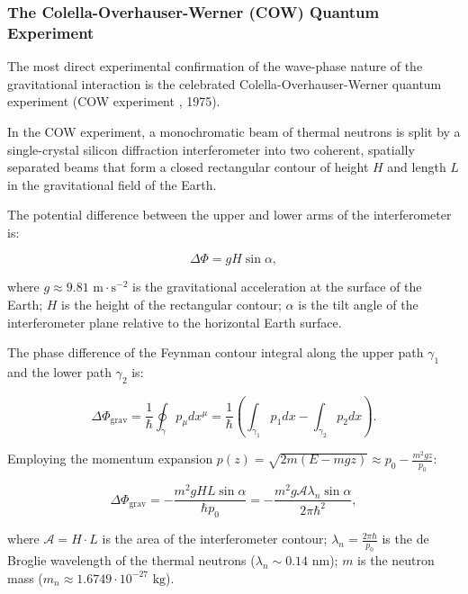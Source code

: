 \documentclass[11pt,a4paper]{article}
\theoremstyle{definition}
\begin{document}
\subsubsection{The Colella-Overhauser-Werner (COW) Quantum Experiment}\label{sec:2.5.2}

The most direct experimental confirmation of the wave-phase nature of the gravitational interaction is the celebrated Colella-Overhauser-Werner quantum experiment (COW experiment \cite{ref17}, 1975).

In the COW experiment, a monochromatic beam of thermal neutrons is split by a single-crystal silicon diffraction interferometer into two coherent, spatially separated beams that form a closed rectangular contour of height $H$ and length $L$ in the gravitational field of the Earth.

The potential difference between the upper and lower arms of the interferometer is:

\begin{equation}\label{eq:2.52}\tag{2.52}
\Delta \Phi = g H \sin\alpha,
\end{equation}

where $g \approx 9.81\text{ m}\cdot\text{s}^{-2}$ is the gravitational acceleration at the surface of the Earth;  
$H$ is the height of the rectangular contour;  
$\alpha$ is the tilt angle of the interferometer plane relative to the horizontal Earth surface.

The phase difference of the Feynman contour integral along the upper path $\gamma_1$ and the lower path $\gamma_2$ is:

\begin{equation}\label{eq:2.53}\tag{2.53}
\Delta \Phi_{\text{grav}} = \frac{1}{\hbar} \oint_\gamma p_\mu dx^\mu = \frac{1}{\hbar} \left( \int_{\gamma_1} p_1 dx - \int_{\gamma_2} p_2 dx \right).
\end{equation}

Employing the momentum expansion $p(z) = \sqrt{2m(E - mgz)} \approx p_0 - \frac{m^2 g z}{p_0}$:

\begin{equation}\label{eq:2.54}\tag{2.54}
\Delta \Phi_{\text{grav}} = -\frac{m^2 g H L \sin\alpha}{\hbar p_0} = -\frac{m^2 g \mathcal{A} \lambda_n \sin\alpha}{2\pi \hbar^2},
\end{equation}

where $\mathcal{A} = H \cdot L$ is the area of the interferometer contour;  
$\lambda_n = \frac{2\pi \hbar}{p_0}$ is the de Broglie wavelength of the thermal neutrons ($\lambda_n \sim 0.14\text{ nm}$);  
$m$ is the neutron mass ($m_n \approx 1.6749 \cdot 10^{-27}\text{ kg}$).
\end{document}
